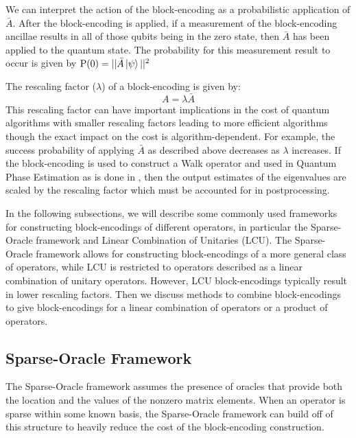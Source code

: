 We can interpret the action of the block-encoding as a probabilistic application of $\bar{A}$.
After the block-encoding is applied, if a measurement of the block-encoding ancillae results in all of those qubits being in the zero state, then $\bar{A}$ has been applied to the quantum state.
The probability for this measurement result to occur is given by $\text{P}(0) = ||\bar{A} \ket{\psi}||^2$

The rescaling factor ($\lambda$) of a block-encoding is given by:
\begin{equation}
    A = \lambda \bar{A}
\end{equation}
This rescaling factor can have important implications in the cost of quantum algorithms with smaller rescaling factors leading to more efficient algorithms though the exact impact on the cost is algorithm-dependent.
For example, the success probability of applying $\bar{A}$ as described above decreases as $\lambda$ increases.
If the block-encoding is used to construct a Walk operator \cite{} and used in Quantum Phase Estimation as is done in \cite{poulin2018quantum, babbush2018encoding, lee2021even}, then the output estimates of the eigenvalues are scaled by the rescaling factor which must be accounted for in postprocessing.

In the following subsections, we will describe some commonly used frameworks for constructing block-encodings of different operators, in particular the Sparse-Oracle framework and Linear Combination of Unitaries (LCU).
The Sparse-Oracle framework allows for constructing block-encodings of a more general class of operators, while LCU is restricted to operators described as a linear combination of unitary operators.
However, LCU block-encodings typically result in lower rescaling factors. 
Then we discuss methods to combine block-encodings to give block-encodings for a linear combination of operators or a product of operators.

\subsection{Sparse-Oracle Framework}
\label{subsec:sparse-be}

The Sparse-Oracle framework \cite{berry2009black, childs2009universal, berry2015hamiltonian,berry2015simulating, low2017optimal,childs2017quantum,gilyen2019quantum} assumes the presence of oracles that provide both the location and the values of the nonzero matrix elements.
When an operator is sparse within some known basis, the Sparse-Oracle framework can build off of this structure to heavily reduce the cost of the block-encoding construction.

